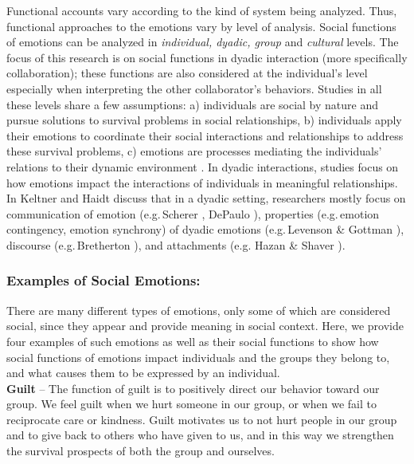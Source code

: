 \documentclass[12pt]{report}
\begin{document}
Functional accounts vary according to the kind of system being analyzed.
Thus, functional approaches to the emotions vary by level of analysis. Social
functions of emotions can be analyzed in \textit{individual, dyadic, group} and
\textit{cultural} levels. The focus of this research is on social functions in
dyadic interaction (more specifically collaboration); these functions are also
considered at the individual's level especially when interpreting the other
collaborator's behaviors. Studies in all these levels share a few assumptions:
a) individuals are social by nature and pursue solutions to survival problems in
social relationships, b) individuals apply their emotions to coordinate their
social interactions and relationships to address these survival problems, c)
emotions are processes mediating the individuals' relations to their dynamic
environment \cite{keltner:emotion-functions}. In dyadic interactions, studies
focus on how emotions impact the interactions of individuals in meaningful
relationships. In \cite{keltner:emotion-functions} Keltner and Haidt discuss
that in a dyadic setting, researchers mostly focus on communication of emotion
(e.g.\,Scherer \cite{scherer:vocal-expression}, DePaulo
\cite{depaulo:nonverbal-behavior}), properties (e.g.\,emotion contingency,
emotion synchrony) of dyadic emotions (e.g.\,Levenson \& Gottman
\cite{levenson:affective-exchange}), discourse (e.g.\,Bretherton
\cite{bretherton:emotions-functionalist}), and attachments (e.g. Hazan \& Shaver
\cite{hazan:emotion-attachment}).

\subsubsection{Examples of Social Emotions:}

There are many different types of emotions, only some of which are considered
social, since they appear and provide meaning in social context. Here, we
provide four examples of such emotions as well as their social functions to
show how social functions of emotions impact individuals and the groups they
belong to, and what causes them to be expressed by an individual.\\

\noindent \textbf{Guilt} -- The function of guilt is to positively direct our
behavior toward our group. We feel guilt when we hurt someone in our group, or
when we fail to reciprocate care or kindness. Guilt motivates us to not hurt
people in our group and to give back to others who have given to us, and in this
way we strengthen the survival prospects of both the group and ourselves.
\end{document}
